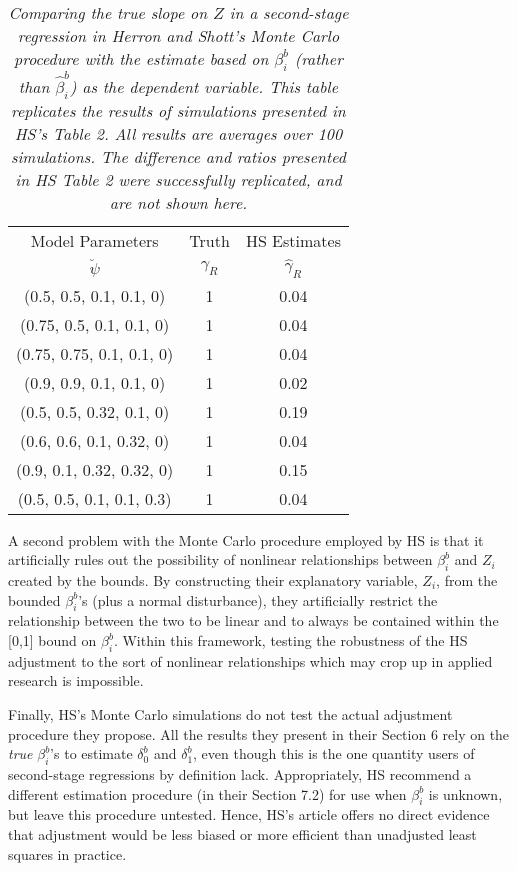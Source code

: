 \documentclass[11pt,titlepage]{article}
\begin{document}
\begin{table}[tb]
\label{t:hsrep}
\begin{center}
\begin{tabular}{c|cc}
Model Parameters & Truth & \multicolumn{1}{c}{HS Estimates} \\
$\breve\psi$  & $\gamma_R$ & $\hat\gamma_R$ \\\hline
(0.5, 0.5, 0.1, 0.1, 0)  &1      &       0.04\\  
(0.75, 0.5, 0.1, 0.1, 0) &1      &       0.04  \\
(0.75, 0.75, 0.1, 0.1, 0)&1      &       0.04  \\
(0.9, 0.9, 0.1, 0.1, 0)  &1      &       0.02  \\
(0.5, 0.5, 0.32, 0.1, 0) &1      &       0.19  \\
(0.6, 0.6, 0.1, 0.32, 0) &1      &       0.04  \\
(0.9, 0.1, 0.32, 0.32, 0)&1      &       0.15  \\
(0.5, 0.5, 0.1, 0.1, 0.3)&1      &       0.04  \\
\hline
\end{tabular}
\end{center}
\caption{\em Comparing the true slope on $Z$ in a 
second-stage regression in Herron and Shott's Monte Carlo 
procedure with the estimate based on $\beta_i^b$ 
(rather than $\hat\beta_i^b$) as the dependent variable.
This table replicates the results of simulations presented in
HS's Table 2.  All results are averages over 100 simulations.  
The difference and ratios presented in HS Table 2 were  
successfully replicated, and are not shown here.}
\end{table}

A second problem with the Monte Carlo procedure employed by HS is that
it artificially rules out the possibility of nonlinear relationships
between $\beta_i^b$ and $Z_i$ created by the bounds.  By constructing
their explanatory variable, $Z_i$, from the bounded $\beta_i^b$'s
(plus a normal disturbance), they artificially restrict the
relationship between the two to be linear and to always be contained
within the [0,1] bound on $\beta_i^b$.  Within this framework, testing
the robustness of the HS adjustment to the sort of nonlinear
relationships which may crop up in applied research is impossible.

Finally, HS's Monte Carlo simulations do not test the actual adjustment
procedure they propose.  All the results they present in their Section
6 rely on the \emph{true} $\beta_i^b$'s to estimate $\delta_0^b$ and
$\delta_1^b$, even though this is the one quantity users of
second-stage regressions by definition lack.  Appropriately, HS
recommend a different estimation procedure (in their Section 7.2) for
use when $\beta_i^b$ is unknown, but leave this procedure untested.
Hence, HS's article offers no direct evidence that adjustment would be
less biased or more efficient than unadjusted least squares in
practice.
\end{document}

